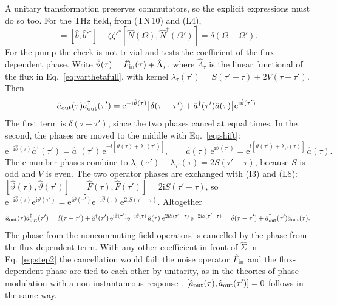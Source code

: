 \documentclass[aps,pra,onecolumn,notitlepage,11pt,amsmath,amssymb,nofootinbib]{revtex4-2}
\newcommand{\Nop}{\hat N}
\newcommand{\ee}{\mathrm{e}}
\newcommand{\ii}{\mathrm{i}}
\begin{document}
A unitary transformation preserves commutators, so the explicit expressions
must do so too. For the THz field, from (TN\,10) and (L4),
\begin{equation}
[\hat b_{\rm out}(\Omega),\hat b_{\rm out}^\dagger(\Omega')]
=[\hat b,\hat b'^\dagger]+\zeta\zeta'^*[\Nop(\Omega),\Nop^\dagger(\Omega')]
=\delta(\Omega-\Omega').
\end{equation}
For the pump the check is not trivial and tests the coefficient of the
flux-dependent phase. Write $\hat\vartheta(\tau)=\hat F_{\rm in}(\tau)+\hat\Lambda_\tau$,
where $\hat\Lambda_\tau$ is the linear functional of the flux in
Eq.~\eqref{eq:varthetafull}, with kernel
$\lambda_\tau(\tau')=S(\tau'-\tau)+2V(\tau-\tau')$. Then
\begin{equation}
\hat a_{\rm out}(\tau)\hat a_{\rm out}^\dagger(\tau')
=\ee^{-\ii\hat\vartheta(\tau)}\big[\delta(\tau-\tau')+\hat a^\dagger(\tau')\hat a(\tau)\big]\ee^{\ii\hat\vartheta(\tau')}.
\end{equation}
The first term is $\delta(\tau-\tau')$, since the two phases cancel at equal
times. In the second, the phases are moved to the middle with
Eq.~\eqref{eq:shift}:
\begin{equation}
\ee^{-\ii\hat\vartheta(\tau)}\hat a^\dagger(\tau')
=\hat a^\dagger(\tau')\,\ee^{-\ii[\hat\vartheta(\tau)+\lambda_\tau(\tau')]},\qquad
\hat a(\tau)\,\ee^{\ii\hat\vartheta(\tau')}
=\ee^{\ii[\hat\vartheta(\tau')+\lambda_{\tau'}(\tau)]}\,\hat a(\tau).
\end{equation}
The c-number phases combine to
$\lambda_\tau(\tau')-\lambda_{\tau'}(\tau)=2S(\tau'-\tau)$, because $S$ is odd
and $V$ is even. The two operator phases are exchanged with (I3) and (L8):
$[\hat\vartheta(\tau),\hat\vartheta(\tau')]=[\hat F(\tau),\hat F(\tau')]
=2\ii S(\tau'-\tau)$, so
$\ee^{-\ii\hat\vartheta(\tau)}\ee^{\ii\hat\vartheta(\tau')}
=\ee^{\ii\hat\vartheta(\tau')}\ee^{-\ii\hat\vartheta(\tau)}\,\ee^{2\ii S(\tau'-\tau)}$.
Altogether
\begin{equation}
\hat a_{\rm out}(\tau)\hat a_{\rm out}^\dagger(\tau')
=\delta(\tau-\tau')+\hat a^\dagger(\tau')\,\ee^{\ii\hat\vartheta(\tau')}\ee^{-\ii\hat\vartheta(\tau)}\,\hat a(\tau)\;
\ee^{2\ii S(\tau'-\tau)}\,\ee^{-2\ii S(\tau'-\tau)}
=\delta(\tau-\tau')+\hat a_{\rm out}^\dagger(\tau')\hat a_{\rm out}(\tau).
\end{equation}
The phase from the noncommuting field operators is cancelled by the phase
from the flux-dependent term. With any other coefficient in front of
$\hat\Sigma$ in Eq.~\eqref{eq:step2} the cancellation would fail: the noise
operator $\hat F_{\rm in}$ and the flux-dependent phase are tied to each
other by unitarity, as in the theories of phase modulation with a
non-instantaneous response \cite{boivin1994,shapirorazavi2007}.
$[\hat a_{\rm out}(\tau),\hat a_{\rm out}(\tau')]=0$ follows in the same way.
\end{document}
